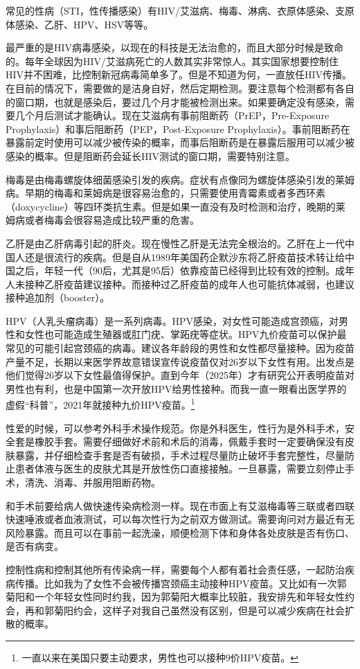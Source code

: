 常见的性病（STI，性传播感染）有HIV/艾滋病、梅毒、淋病、衣原体感染、支原体感染、乙肝、HPV、HSV等等。

最严重的是HIV病毒感染，以现在的科技是无法治愈的，而且大部分时候是致命的。每年全球因为HIV/艾滋病死亡的人数其实非常惊人。其实国家想要控制住HIV并不困难，比控制新冠病毒简单多了。但是不知道为何，一直放任HIV传播。在目前的情况下，需要做的是洁身自好，然后定期检测。要注意每个检测都有各自的窗口期，也就是感染后，要过几个月才能被检测出来。如果要确定没有感染，需要几个月后测试才能确认。现在艾滋病有事前阻断药（PrEP，Pre-Exposure Prophylaxis）和事后阻断药（PEP，Post-Exposure Prophylaxis）。事前阻断药在暴露前定时使用可以减少被传染的概率，而事后阻断药是在暴露后服用可以减少被感染的概率。但是阻断药会延长HIV测试的窗口期，需要特别注意。

梅毒是由梅毒螺旋体细菌感染引发的疾病。症状有点像同为螺旋体感染引发的莱姆病。早期的梅毒和莱姆病是很容易治愈的，只需要使用青霉素或者多西环素（doxycycline）等四环类抗生素。但是如果一直没有及时检测和治疗，晚期的莱姆病或者梅毒会很容易造成比较严重的危害。

乙肝是由乙肝病毒引起的肝炎。现在慢性乙肝是无法完全根治的。乙肝在上一代中国人还是很流行的疾病。但是自从1989年美国药企默沙东将乙肝疫苗技术转让给中国之后，年轻一代（90后，尤其是95后）依靠疫苗已经得到比较有效的控制。成年人未接种乙肝疫苗建议接种。而接种过乙肝疫苗的成年人也可能抗体减弱，也建议接种追加剂（booster）。

HPV（人乳头瘤病毒）是一系列病毒。HPV感染，对女性可能造成宫颈癌，对男性和女性也可能造成生殖器或肛门疣、掌跖疣等症状。HPV九价疫苗可以保护最常见的可能引起宫颈癌的病毒。建议各年龄段的男性和女性都尽量接种。因为疫苗产量不足，长期以来医学界故意错误宣传说疫苗仅对26岁以下女性有用。出发点是他们觉得26岁以下女性最值得保护。直到今年（2025年）才有研究公开表明疫苗对男性也有利，也是中国第一次开放HPV给男性接种。而我一直一眼看出医学界的虚假``科普''，2021年就接种九价HPV疫苗。\footnote{一直以来在美国只要主动要求，男性也可以接种9价HPV疫苗。}

性爱的时候，可以参考外科手术操作规范。你是外科医生，性行为是外科手术，安全套是橡胶手套。需要仔细做好术前和术后的消毒，佩戴手套时一定要确保没有皮肤暴露，并仔细检查手套是否有破损，手术过程尽量防止破坏手套完整性，尽量防止患者体液与医生的皮肤尤其是开放性伤口直接接触。一旦暴露，需要立刻停止手术，清洗、消毒、并服用阻断药物。

和手术前要给病人做快速传染病检测一样。现在市面上有艾滋梅毒等三联或者四联快速唾液或者血液测试，可以每次性行为之前双方做测试。需要询问对方最近有无风险暴露。而且可以在事前一起洗澡，顺便检测下体和身体各处皮肤是否有伤口、是否有病变。

控制性病和控制其他所有传染病一样，需要每个人都有着社会责任感，一起防治疾病传播。比如我为了女性不会被传播宫颈癌主动接种HPV疫苗。又比如有一次郭菊阳和一个年轻女性同时约我，因为郭菊阳大概率比较脏，我安排先和年轻女性约会，再和郭菊阳约会，这样子对我自己虽然没有区别，但是可以减少疾病在社会扩散的概率。
